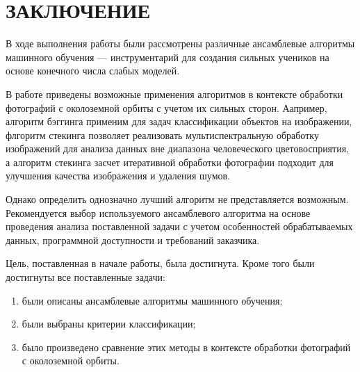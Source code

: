 \chapter*{ЗАКЛЮЧЕНИЕ}
 
В ходе выполнения работы были рассмотрены различные ансамблевые алгоритмы машинного обучения --- инструментарий для создания сильных учеников на основе конечного числа слабых моделей.

В работе приведены возможные применения алгоритмов в контексте обработки фотографий с околоземной орбиты с учетом их сильных сторон. Аапример,  алгоритм бэггинга применим для задач классификации объектов на изображении, флгоритм стекинга позволяет реализовать мультиспектральную обработку изображений для анализа данных вне диапазона человеческого цветовосприятия, а алгоритм стекинга засчет итеративной обработки фотографии подходит для улучшения качества изображения и удаления шумов.

Однако определить однозначно лучший алгоритм не представляется возможным. Рекомендуется выбор используемого ансамблевого алгоритма на основе проведения анализа поставленной задачи с учетом особенностей обрабатываемых данных, программной доступности и требований заказчика.



Цель, поставленная в начале работы, была достигнута. Кроме того были достигнуты все поставленные задачи:
\begin{enumerate}
	\item были описаны ансамблевые алгоритмы машинного обучения;
	\item были выбраны критерии классификации;
	\item было произведено сравнение этих методы в контексте обработки фотографий с околоземной орбиты.
\end{enumerate}

